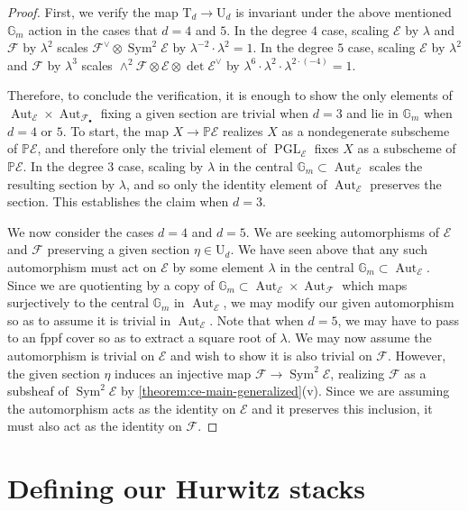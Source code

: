 \documentclass[12 pt]{amsart}
\theoremstyle{plain}
\theoremstyle{definition}
\theoremstyle{remark}
\numberwithin{equation}{section}
\newcommand\bg{\mathbb G}
\newcommand\bp{\mathbb P}
\newcommand\sce{\mathscr E}
\newcommand\scf{\mathscr F}
\newcommand\auttorsor[1]{\mathrm{T}_{d}} %
\newcommand\gorensteinsections[1]{\mathrm{U}_{d}} %
\DeclareMathOperator\sym{Sym}
\DeclareMathOperator\pgl{PGL}
\DeclareMathOperator\aut{Aut}
\begin{document}
\begin{proof}
	First, we verify the map $\auttorsor d \to \gorensteinsections d$ is
	invariant under the above mentioned $\bg_m$ action in the cases that $d
	=4$ and $5$.  In the degree $4$ case, scaling $\sce$ by $\lambda$ and
	$\scf$ by $\lambda^2$ scales $\scf^\vee \otimes \sym^2 \sce$ by
	$\lambda^{-2} \cdot \lambda^2 = 1$.  In the degree $5$ case, scaling
	$\sce$ by $\lambda^2$ and $\scf$ by $\lambda^3$ scales $\wedge^2 \scf
	\otimes \sce \otimes \det \sce^\vee$ by $\lambda^6 \cdot \lambda^2 \cdot
	\lambda^{2 \cdot {(-4)}} = 1$.


	Therefore, to conclude the verification, it is enough to show the only
	elements of $\aut_{\sce} \times \aut_{\scf_\bullet}$ fixing a given
	section are trivial when $d = 3$ and lie in $\bg_m$ when $d = 4$ or $5$.
	To start, the map $X \to \bp \sce$ realizes $X$ as a nondegenerate
	subscheme of $\bp \sce$, and therefore only the trivial element of
	$\pgl_{\sce}$ fixes $X$ as a subscheme of $\bp \sce$.  In the degree $3$
	case, scaling by $\lambda$ in the central $\bg_m \subset \aut_{\sce}$
	scales the resulting section by $\lambda$, and so only the identity
	element of $\aut_{\sce}$ preserves the section.  This establishes the
	claim when $d = 3$.

	We now consider the cases $d= 4$ and $d = 5$.  We are seeking
	automorphisms of $\sce$ and $\scf$ preserving a given section
	$\eta \in \gorensteinsections d$.
	We have seen above that any such automorphism must act on $\sce$ by some element $\lambda$ in the
	central $\bg_m \subset \aut_{\sce}$.  Since we are quotienting by a copy
	of $\bg_m \subset \aut_{\sce} \times \aut_{\scf}$ which maps
	surjectively to the central $\bg_m$ in $\aut_{\sce}$, we may modify our
	given automorphism so as to assume it is trivial in $\aut_{\sce}$. Note
	that when $d = 5$, we may have to pass to an fppf cover so as to extract
	a square root of $\lambda$.  We may now assume the automorphism is
	trivial on $\sce$ and wish to show it is also trivial on $\scf$.
	However, the given section $\eta$ induces an injective map $\scf \to
	\sym^2 \sce$, realizing $\scf$ as a subsheaf of $\sym^2 \sce$ by
	\autoref{theorem:ce-main-generalized}(v).  Since we are assuming the
	automorphism acts as the identity on $\sce$ and it preserves this
	inclusion, it must also act as the identity on $\scf$.  
\end{proof}


\section{Defining our Hurwitz stacks}
\label{section:hurwitz-definition}
\end{document}
